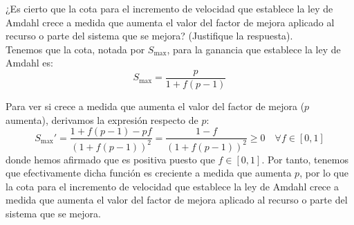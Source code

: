 \begin{cuestion}
    ¿Es cierto que la cota para el incremento de velocidad que establece la ley de Amdahl crece a medida
    que aumenta el valor del factor de mejora aplicado al recurso o parte del sistema que se mejora?
    (Justifique la respuesta).\\

    Tenemos que la cota, notada por $S_{\max}$, para la ganancia que establece la ley de Amdahl es:
    \begin{equation*}
        S_{\max}= \frac{p}{1+f(p-1)}
    \end{equation*}

    Para ver si crece a medida que aumenta el valor del factor de mejora ($p$ aumenta), derivamos la expresión respecto de $p$:
    \begin{equation*}
        S_{\max}' = \frac{1+f(p-1) -pf}{(1+f(p-1))^2}
        = \frac{1-f}{(1+f(p-1))^2} \geq 0 \quad \forall f\in [0,1]
    \end{equation*}
    donde hemos afirmado que es positiva puesto que $f\in [0,1]$.
    Por tanto, tenemos que efectivamente dicha función es creciente a medida que aumenta $p$,
    por lo que la cota para el incremento de velocidad que establece la ley de Amdahl crece a medida
    que aumenta el valor del factor de mejora aplicado al recurso o parte del sistema que se mejora.
\end{cuestion}

